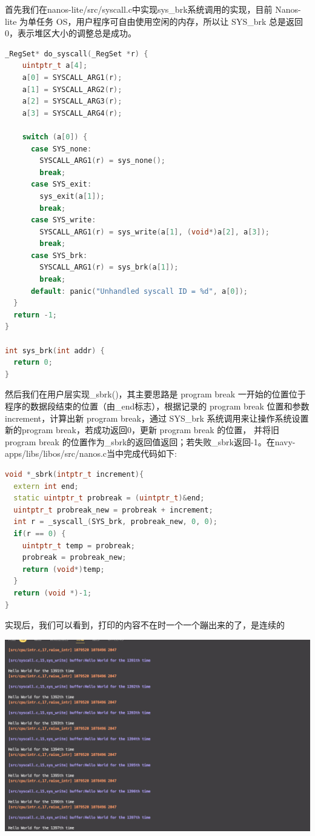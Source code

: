 \documentclass[UTF8,a4paper,10pt]{ctexart}
\begin{document}
首先我们在nanos-lite/src/syscall.c中实现sys\_brk系统调用的实现，目前 Nanos-
lite 为单任务 OS，用户程序可自由使用空闲的内存，所以让 SYS\_brk 总是返回0，表示堆区大小的调整总是成功。
\begin{lstlisting}[language = C++]
_RegSet* do_syscall(_RegSet *r) {
    uintptr_t a[4];
    a[0] = SYSCALL_ARG1(r);
    a[1] = SYSCALL_ARG2(r);
    a[2] = SYSCALL_ARG3(r);
    a[3] = SYSCALL_ARG4(r);
  
    switch (a[0]) {
      case SYS_none: 
        SYSCALL_ARG1(r) = sys_none();
        break;
      case SYS_exit: 
        sys_exit(a[1]);
        break;
      case SYS_write:
        SYSCALL_ARG1(r) = sys_write(a[1], (void*)a[2], a[3]);
        break;
      case SYS_brk:
        SYSCALL_ARG1(r) = sys_brk(a[1]);
        break;
      default: panic("Unhandled syscall ID = %d", a[0]);
  }
  return -1;
}

int sys_brk(int addr) {
  return 0;
}
\end{lstlisting}

然后我们在用户层实现\_sbrk()，其主要思路是
program break 一开始的位置位于程序的数据段结束的位置（由\_end标志），根据记录的 program break 位置和参数 increment，计算出新 program break，通过 SYS\_brk 系统调用来让操作系统设置新的program break，若成功返回0，更新 program break 的位置， 并将旧 program break 的位置作为\_sbrk的返回值返回；若失败\_sbrk返回-1。在navy-apps/libs/libos/src/nanos.c当中完成代码如下:
\begin{lstlisting}[language = C++]
void *_sbrk(intptr_t increment){
  extern int end;
  static uintptr_t probreak = (uintptr_t)&end;
  uintptr_t probreak_new = probreak + increment;
  int r = _syscall_(SYS_brk, probreak_new, 0, 0);
  if(r == 0) {
    uintptr_t temp = probreak;
    probreak = probreak_new;
    return (void*)temp;
  }
  return (void *)-1;
}
\end{lstlisting}
实现后，我们可以看到，打印的内容不在时一个一个蹦出来的了，是连续的
\begin{center}
  \includegraphics*[scale = 0.35]{pic/4}
\end{center}
\end{document}
